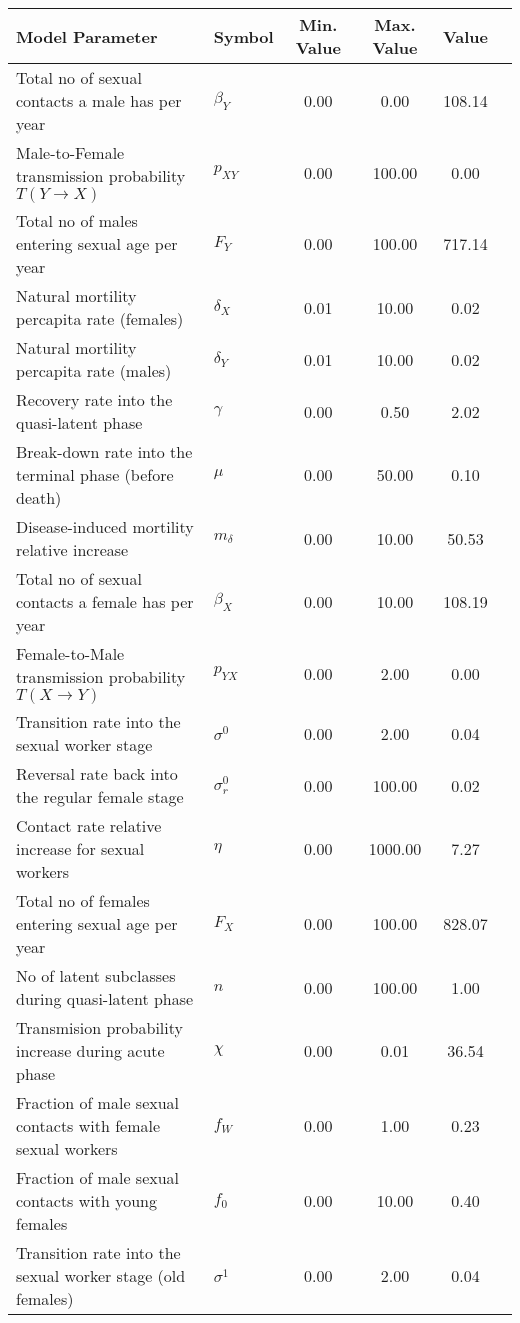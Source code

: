 \begin{table}
\centering
\begin{tabular}{p{5cm}lcccc}
{\bf Model Parameter} & {\bf Symbol} & {\bf Min. Value} & {\bf Max. Value} & {\bf Value}\\
\hline\hline
Total no of sexual contacts a male has per year & $\beta_Y$ & 0.00 & 0.00 & 108.14\\
Male-to-Female transmission probability $T(Y\rightarrow X)$ & $p_{XY}$ & 0.00 & 100.00 & 0.00\\
Total no of males entering sexual age per year & $F_Y$ & 0.00 & 100.00 & 717.14\\
Natural mortility percapita rate (females) & $\delta_X$ & 0.01 & 10.00 & 0.02\\
Natural mortility percapita rate (males) & $\delta_Y$ & 0.01 & 10.00 & 0.02\\
Recovery rate into the quasi-latent phase & $\gamma$ & 0.00 & 0.50 & 2.02\\
Break-down rate into the terminal phase (before death) & $\mu$ & 0.00 & 50.00 & 0.10\\
Disease-induced mortility relative increase & $m_{\delta}$ & 0.00 & 10.00 & 50.53\\
Total no of sexual contacts a female has per year & $\beta_X$ & 0.00 & 10.00 & 108.19\\
Female-to-Male transmission probability $T(X\rightarrow Y)$ & $p_{YX}$ & 0.00 & 2.00 & 0.00\\
Transition rate into the sexual worker stage & $\sigma^0$ & 0.00 & 2.00 & 0.04\\
Reversal rate back into the regular female stage & $\sigma^0_r$ & 0.00 & 100.00 & 0.02\\
Contact rate relative increase for sexual workers & $\eta$ & 0.00 & 1000.00 & 7.27\\
Total no of females entering sexual age per year & $F_X$ & 0.00 & 100.00 & 828.07\\
No of latent subclasses during quasi-latent phase & $n$ & 0.00 & 100.00 & 1.00\\
Transmision probability increase during acute phase & $\chi$ & 0.00 & 0.01 & 36.54\\
Fraction of male sexual contacts with female sexual workers & $f_W$ & 0.00 & 1.00 & 0.23\\
Fraction of male sexual contacts with young females & $f_0$ & 0.00 & 10.00 & 0.40\\
Transition rate into the sexual worker stage (old females) & $\sigma^1$ & 0.00 & 2.00 & 0.04\\

\end{tabular}
\end{table}
